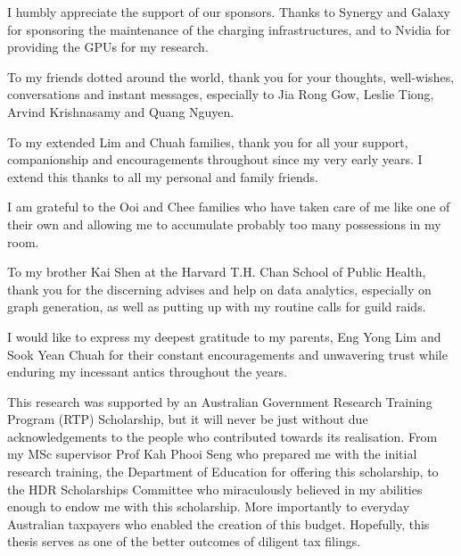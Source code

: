 \begin{acknowledgements}
I humbly appreciate the support of our sponsors. Thanks to Synergy and Galaxy for sponsoring the maintenance of the charging infrastructures, and to Nvidia for providing the GPUs for my research.%

To my friends dotted around the world, thank you for your thoughts, well-wishes, conversations and instant messages, especially to Jia Rong Gow, Leslie Tiong, Arvind Krishnasamy and Quang Nguyen. 

To my extended Lim and Chuah families, thank you for all your support, companionship and encouragements throughout since my very early years. I extend this thanks to all my personal and family friends.

I am grateful to the Ooi and Chee families who have taken care of me like one of their own and allowing me to accumulate probably too many possessions in my room.

To my brother Kai Shen at the Harvard T.H. Chan School of Public Health, thank you for the discerning advises and help on data analytics, especially on graph generation, as well as putting up with my routine calls for guild raids.

I would like to express my deepest gratitude to my parents, Eng Yong Lim and Sook Yean Chuah for their constant encouragements and unwavering trust while enduring my incessant antics throughout the years.

This research was supported by an Australian Government Research Training Program (RTP) Scholarship, but it will never be just without due acknowledgements to the people who contributed towards its realisation. From my MSc supervisor Prof Kah Phooi Seng who prepared me with the initial research training, the Department of Education for offering this scholarship, to the HDR Scholarships Committee who miraculously believed in my abilities enough to endow me with this scholarship. More importantly to everyday Australian taxpayers who enabled the creation of this budget. Hopefully, this thesis serves as one of the better outcomes of diligent tax filings.




\end{acknowledgements}


